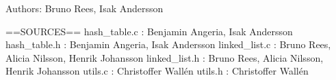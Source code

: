 Authors\+: Bruno Rees, Isak Andersson

==S\+O\+U\+R\+C\+ES== hash\+\_\+table.\+c \+: Benjamin Angeria, Isak Andersson hash\+\_\+table.\+h \+: Benjamin Angeria, Isak Andersson linked\+\_\+list.\+c \+: Bruno Rees, Alicia Nilsson, Henrik Johansson linked\+\_\+list.\+h \+: Bruno Rees, Alicia Nilsson, Henrik Johansson utils.\+c \+: Christoffer Wallén utils.\+h \+: Christoffer Wallén 